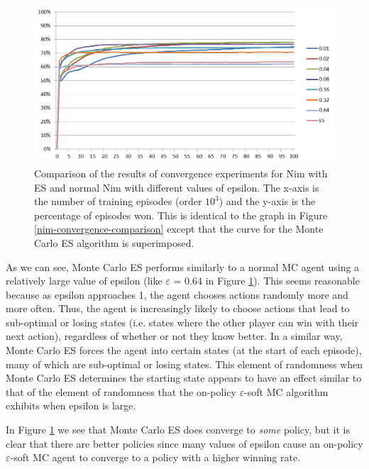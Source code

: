 \documentclass[11pt,a4paper,twoside,openright]{report}
\begin{document}
\begin{figure}[htbp]
	\begin{center}
		\includegraphics[width=\linewidth]{Nim_PerformanceResults_Comparison_001_to_064_and_ES.png}
		\caption{Comparison of the results of convergence experiments for Nim with ES and normal Nim with different values of epsilon. The x-axis is the number of training episodes (order $10^3$) and the y-axis is the percentage of episodes won. This is identical to the graph in Figure \ref{nim-convergence-comparison} except that the curve for the Monte Carlo ES algorithm is superimposed.}
		\label{nim-convergence-comparison-with-ES}
	\end{center}
\end{figure}

As we can see, Monte Carlo ES performs similarly to a normal MC agent using a relatively large value of epsilon (like $\varepsilon$ = 0.64 in Figure \ref{nim-convergence-comparison-with-ES}). This seems reasonable because as epsilon approaches 1, the agent chooses actions randomly more and more often. Thus, the agent is increasingly likely to choose actions that lead to sub-optimal or losing states (i.e. states where the other player can win with their next action), regardless of whether or not they know better. In a similar way, Monte Carlo ES forces the agent into certain states (at the start of each episode), many of which are sub-optimal or losing states. This element of randomness when Monte Carlo ES determines the starting state appears to have an effect similar to that of the element of randomness that the on-policy $\varepsilon$-soft MC algorithm exhibits when epsilon is large.

In Figure \ref{nim-convergence-comparison-with-ES} we see that Monte Carlo ES does converge to \emph{some} policy, but it is clear that there are better policies since many values of epsilon cause an on-policy $\varepsilon$-soft MC agent to converge to a policy with a higher winning rate.
\end{document}
